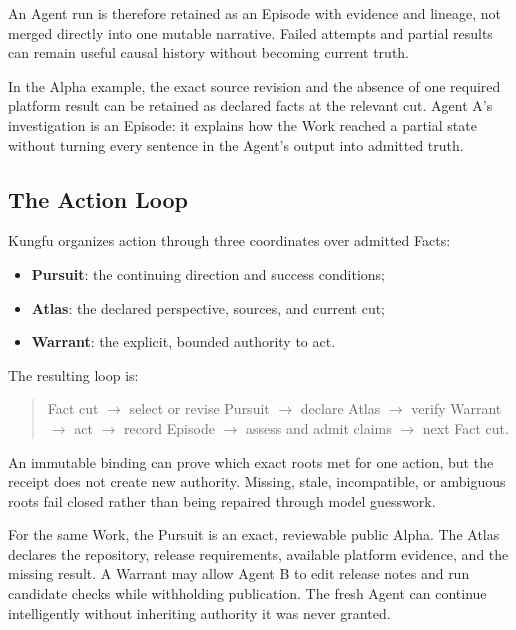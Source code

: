 An Agent run is therefore retained as an Episode with evidence and lineage,
not merged directly into one mutable narrative. Failed attempts and partial
results can remain useful causal history without becoming current truth.

In the Alpha example, the exact source revision and the absence of one required
platform result can be retained as declared facts at the relevant cut. Agent
A's investigation is an Episode: it explains how the Work reached a partial
state without turning every sentence in the Agent's output into admitted
truth.

\newpage

\subsection{The Action Loop}

Kungfu organizes action through three coordinates over admitted Facts:

\begin{itemize}[leftmargin=*]
  \item \textbf{Pursuit}: the continuing direction and success conditions;
  \item \textbf{Atlas}: the declared perspective, sources, and current cut;
  \item \textbf{Warrant}: the explicit, bounded authority to act.
\end{itemize}

The resulting loop is:

\begin{quote}
Fact cut $\rightarrow$ select or revise Pursuit $\rightarrow$ declare Atlas
$\rightarrow$ verify Warrant $\rightarrow$ act $\rightarrow$ record Episode
$\rightarrow$ assess and admit claims $\rightarrow$ next Fact cut.
\end{quote}

An immutable binding can prove which exact roots met for one action, but the
receipt does not create new authority. Missing, stale, incompatible, or
ambiguous roots fail closed rather than being repaired through model guesswork.

For the same Work, the Pursuit is an exact, reviewable public Alpha. The Atlas
declares the repository, release requirements, available platform evidence,
and the missing result. A Warrant may allow Agent B to edit release notes and
run candidate checks while withholding publication. The fresh Agent can
continue intelligently without inheriting authority it was never granted.

